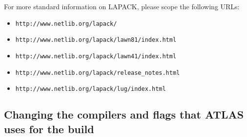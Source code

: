 \documentclass[11pt]{article}
\begin{document}
For more standard information on LAPACK, please scope the following URLs:
\vspace*{-0.1in}
\begin{itemize}
\item \verb|http://www.netlib.org/lapack/|
\vspace*{-0.1in}
\item \verb|http://www.netlib.org/lapack/lawn81/index.html|
\vspace*{-0.1in}
\item \verb|http://www.netlib.org/lapack/lawn41/index.html|
\vspace*{-0.1in}
\item \verb|http://www.netlib.org/lapack/release_notes.html|
\vspace*{-0.1in}
\item \verb|http://www.netlib.org/lapack/lug/index.html|
\end{itemize}

\subsection{Changing the compilers and flags that ATLAS uses for the build}
\label{sec-comps}
\end{document}

